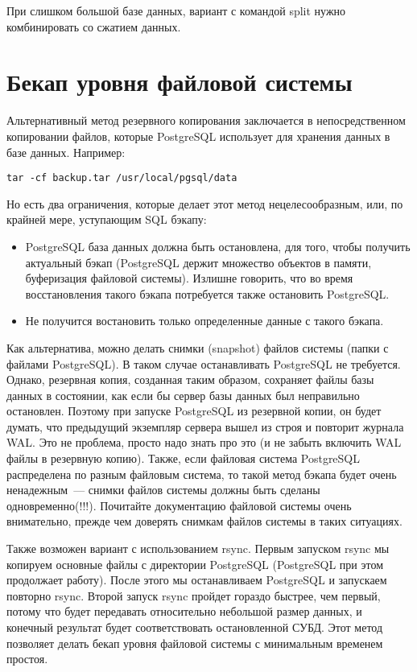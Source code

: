 При слишком большой базе данных, вариант с командой split нужно комбинировать со сжатием данных.


\section{Бекап уровня файловой системы}
Альтернативный метод резервного копирования заключается в непосредственном копировании файлов,
которые PostgreSQL использует для хранения данных в базе данных. Например:
\begin{lstlisting}[label=lst:backups14,caption=Бэкап PostgreSQL файлов]
tar -cf backup.tar /usr/local/pgsql/data
\end{lstlisting}

Но есть два ограничения, которые делает этот метод нецелесообразным, или, по крайней мере, уступающим SQL бэкапу:
\begin{itemize}
\item PostgreSQL база данных должна быть остановлена, для того, чтобы получить актуальный бэкап
(PostgreSQL держит множество объектов в памяти, буферизация файловой системы). Излишне говорить,
что во время восстановления такого бэкапа потребуется также остановить PostgreSQL.
\item Не получится востановить только определенные данные с такого бэкапа.
\end{itemize}

Как альтернатива, можно делать снимки (snapshot) файлов системы (папки с файлами PostgreSQL). В таком случае останавливать PostgreSQL
не требуется. Однако, резервная копия, созданная таким образом, сохраняет файлы базы данных в состоянии, как если бы сервер базы данных
был неправильно остановлен. Поэтому при запуске PostgreSQL из резервной копии, он будет думать, что предыдущий экземпляр
сервера вышел из строя и повторит журнала WAL. Это не проблема, просто надо знать про это (и не забыть включить WAL файлы
в резервную копию). Также, если файловая система PostgreSQL распределена по разным файловым система, то такой метод бэкапа
будет очень ненадежным~--- снимки файлов системы должны быть сделаны одновременно(!!!). Почитайте документацию файловой
системы очень внимательно, прежде чем доверять снимкам файлов системы в таких ситуациях.

Также возможен вариант с использованием rsync. Первым запуском rsync мы копируем основные файлы с директории PostgreSQL
(PostgreSQL при этом продолжает работу). После этого
мы останавливаем PostgreSQL и запускаем повторно rsync. Второй запуск rsync пройдет гораздо быстрее, чем первый,
потому что будет передавать относительно небольшой размер данных,
и конечный результат будет соответствовать остановленной СУБД.
Этот метод позволяет делать бекап уровня файловой системы с минимальным временем простоя.

